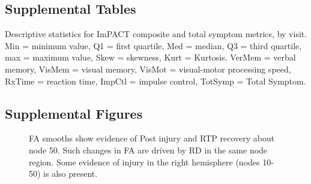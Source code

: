 \documentclass[12pt]{article}
\begin{document}
\subsection{Supplemental Tables}
\label{ssec:supp-tables}
\begin{table}[H]
	\scriptsize
	
	\caption{Descriptive statistics for ImPACT composite and total symptom metrics, by visit. Min = minimum value, Q1 = first quartile, Med = median, Q3 = third quartile, max = maximum value, Skew = skewness, Kurt = Kurtosis. VerMem = verbal memory, VisMem = visual memory, VisMot = visual-motor processing speed, RxTime = reaction time, ImpCtl = impulse control, TotSymp = Total Symptom.}
	\label{supp-tbl:imp-desc}
\end{table}


\subsection{Supplemental Figures}
\label{ssec:supp-figures}

\begin{figure}[H]
	\centering
	\caption{FA smooths show evidence of Post injury and RTP recovery about node 50. Such changes in FA are driven by RD in the same node region. Some evidence of injury in the right hemisphere (nodes 10-50) is also present.}
	\label{supp-fig:lgio-gam-recov}
\end{figure}
\end{document}
